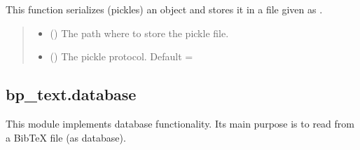 \documentclass[letterpaper,10pt,english]{sphinxmanual}
\begin{document}

\begin{fulllineitems}
\label{\detokenize{generated/bp_text.utilities:bp_text.utilities.write_pickle}}
\pysigstartsignatures
\pysiglinewithargsret
{}
{\sphinxparamcomma {}\sphinxparamcomma {}}
{}
\pysigstopsignatures
\sphinxAtStartPar
This function serializes (pickles) an object and stores it in a file
given as .
\begin{quote}\begin{description}
\begin{itemize}
\item {} 
\sphinxAtStartPar
{} () \textendash{} The path where to store the pickle file.

\item {} 
\sphinxAtStartPar
{} () \textendash{} The pickle protocol. Default = 

\end{itemize}

\end{description}\end{quote}

\end{fulllineitems}


\sphinxstepscope


\subsection{bp\_text.database}
\label{\detokenize{generated/bp_text.database:module-bp_text.database}}\label{\detokenize{generated/bp_text.database:bp-text-database}}\label{\detokenize{generated/bp_text.database::doc}}
\sphinxAtStartPar
This module implements database functionality.  Its main purpose is to read
from a BibTeX file (as database).
\end{document}
